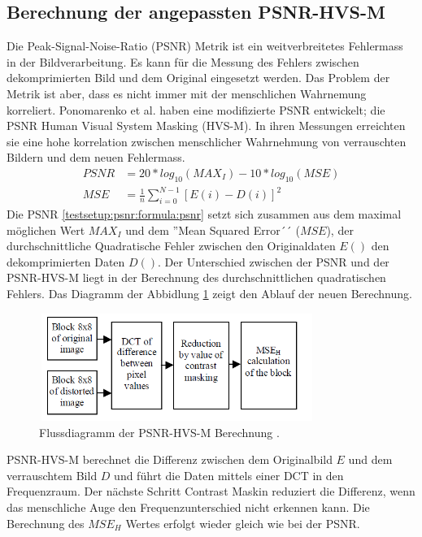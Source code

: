 \subsection{Berechnung der angepassten PSNR-HVS-M}\label{testsetup:psnr}
Die Peak-Signal-Noise-Ratio (PSNR) Metrik ist ein weitverbreitetes Fehlermass in der Bildverarbeitung. Es kann für die Messung des Fehlers zwischen dekomprimierten Bild und dem Original eingesetzt werden. Das Problem der Metrik ist aber, dass es nicht immer mit der menschlichen Wahrnemung korreliert. Ponomarenko et al.  \cite{ponomarenko2007between:psnr} haben eine modifizierte PSNR entwickelt; die PSNR Human Visual System Masking (HVS-M). In ihren Messungen erreichten sie eine hohe korrelation zwischen menschlicher Wahrnehmung von  verrauschten Bildern und dem neuen Fehlermass.\\
[\baselineskip]
\begin{equation} \label{testsetup:psnr:formula:psnr}
\begin{split}
PSNR & = 20 * log_{10}(MAX_I) - 10*log_{10}(MSE) \\
MSE & = \frac{1}{n}\sum_{i=0}^{N-1}[E(i)-D(i)]^2
\end{split}
\end{equation}
Die PSNR \eqref{testsetup:psnr:formula:psnr} setzt sich zusammen aus dem maximal möglichen Wert $MAX_I$ und dem ''Mean Squared Error´´ ($MSE$), der durchschnittliche Quadratische Fehler zwischen den Originaldaten $E()$ den dekomprimierten Daten $D()$.
Der Unterschied zwischen der PSNR und der PSNR-HVS-M liegt in der Berechnung des durchschnittlichen quadratischen Fehlers. Das Diagramm der Abbidlung \ref{testsetup:ablauf:psnr:flowchart} zeigt den Ablauf der neuen Berechnung.\\
\begin{figure}[!htbp]
	\center
	\includegraphics[width=0.8\textwidth,height=3.5cm,keepaspectratio]{./pictures/testsetup/psnr-hvs-m-flow.png}
	\caption{Flussdiagramm der PSNR-HVS-M Berechnung \cite{ponomarenko2007between:psnr}.}
	\label{testsetup:ablauf:psnr:flowchart}
\end{figure}
PSNR-HVS-M berechnet die Differenz zwischen dem Originalbild $E$ und dem verrauschtem Bild $D$ und führt die Daten mittels einer DCT in den Frequenzraum. Der nächste Schritt Contrast Maskin reduziert die Differenz, wenn das menschliche Auge den Frequenzunterschied nicht erkennen kann. Die Berechnung des $MSE_H$ Wertes erfolgt wieder gleich wie bei der PSNR.

